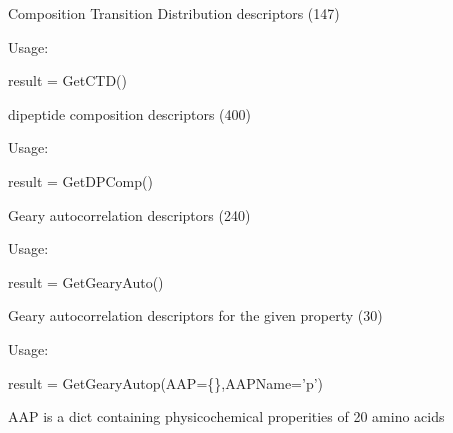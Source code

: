 \documentclass[letterpaper,10pt,english]{sphinxmanual}
\begin{document}
\begin{fulllineitems}

\begin{fulllineitems}
\label{reference/PyProteinclass:PyProtein.PyProtein.GetCTD}
Composition Transition Distribution descriptors (147)

Usage:

result = GetCTD()

\end{fulllineitems}


\begin{fulllineitems}
\label{reference/PyProteinclass:PyProtein.PyProtein.GetDPComp}
dipeptide composition descriptors (400)

Usage:

result = GetDPComp()

\end{fulllineitems}


\begin{fulllineitems}
\label{reference/PyProteinclass:PyProtein.PyProtein.GetGearyAuto}
Geary autocorrelation descriptors (240)

Usage:

result = GetGearyAuto()

\end{fulllineitems}


\begin{fulllineitems}
\label{reference/PyProteinclass:PyProtein.PyProtein.GetGearyAutop}
Geary autocorrelation descriptors for the given property (30)

Usage:

result = GetGearyAutop(AAP=\{\},AAPName='p')

AAP is a dict containing physicochemical properities of 20 amino acids

\end{fulllineitems}



\end{fulllineitems}
\end{document}
